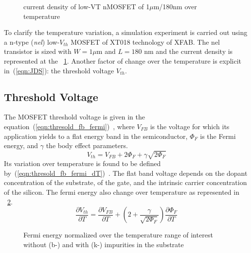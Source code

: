 \begin{figure}[!ht]
    \centering
    
    \caption{current density of low-VT nMOSFET of 1\(\mu \)m/180nm over temperature}
    \label{fig:jds_nel}
\end{figure}

To clarify the temperature variation, a simulation experiment is carried out using a n-type (\emph{nel}) low-\(V_{th}\) MOSFET of XT018 technology of XFAB\@. The nel transistor is sized with \(W = 1 \mu \)m and \(L=180\) nm and the current density is represented at the \figurename~\ref{fig:jds_nel}. Another factor of change over the temperature is explicit in~(\ref{eqn:JDS}): the threshold voltage \(V_{th} \).

\subsection{Threshold Voltage}      %
\label{sec:threshold}
The MOSFET threshold voltage is given in the equation~(\ref{eqn:thresold_fb_fermi})~\cite{Sze2006}, where \(V_{FB} \) is the voltage for which its application yields to a flat energy band in the semiconductor, \(\Phi_F \) is the Fermi energy, and \(\gamma \) the body effect parameters.
\begin{equation}
\label{eqn:thresold_fb_fermi}
V_{th} = V_{FB} + 2 \Phi_F + \gamma \sqrt{2 \Phi_F}
\end{equation}
Its variation over temperature is found to be defined by~(\ref{eqn:thresold_fb_fermi_dT})~\cite{Filanovsky2001}. The flat band voltage depends on the dopant concentration of the substrate, of the gate, and the intrinsic carrier concentration of the silicon. The fermi energy also change over temperature as represented in \figurename~\ref{fig:electron_fermi_si}.
\begin{equation}
    \label{eqn:thresold_fb_fermi_dT}
    \frac{\partial V_{th}}{\partial T} = \frac{\partial V_{FB}}{\partial T} + \left( 2  + \frac{\gamma}{\sqrt{2 \Phi_F}} \right) \frac{\partial \Phi_F}{\partial T}
\end{equation}

\begin{figure}[!ht]
    \centering
    
    \caption{Fermi energy normalized over the temperature range of interest without (b-) and with (k-) impurities in the substrate}
    \label{fig:electron_fermi_si}
\end{figure}

